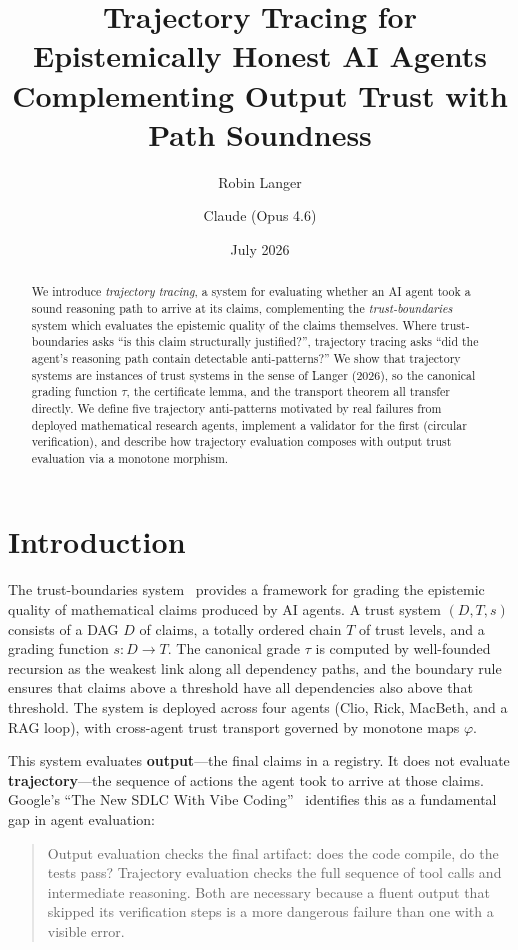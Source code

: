 \documentclass[11pt,a4paper]{article}
\title{Trajectory Tracing for Epistemically Honest AI Agents\\[6pt]
\large Complementing Output Trust with Path Soundness}
\author{Robin Langer \and Claude (Opus 4.6)}
\date{July 2026}
\theoremstyle{definition}
\theoremstyle{plain}
\theoremstyle{remark}
\begin{document}
\maketitle

\begin{abstract}
We introduce \emph{trajectory tracing}, a system for evaluating whether an AI agent took a sound reasoning path to arrive at its claims, complementing the \emph{trust-boundaries} system which evaluates the epistemic quality of the claims themselves. Where trust-boundaries asks ``is this claim structurally justified?'', trajectory tracing asks ``did the agent's reasoning path contain detectable anti-patterns?'' We show that trajectory systems are instances of trust systems in the sense of Langer (2026), so the canonical grading function $\tau$, the certificate lemma, and the transport theorem all transfer directly. We define five trajectory anti-patterns motivated by real failures from deployed mathematical research agents, implement a validator for the first (circular verification), and describe how trajectory evaluation composes with output trust evaluation via a monotone morphism.
\end{abstract}

\tableofcontents

\section{Introduction}

The trust-boundaries system~\cite{trust-boundaries} provides a framework for grading the epistemic quality of mathematical claims produced by AI agents. A trust system $(D, T, s)$ consists of a DAG $D$ of claims, a totally ordered chain $T$ of trust levels, and a grading function $s : D \to T$. The canonical grade $\tau$ is computed by well-founded recursion as the weakest link along all dependency paths, and the boundary rule ensures that claims above a threshold have all dependencies also above that threshold. The system is deployed across four agents (Clio, Rick, MacBeth, and a RAG loop), with cross-agent trust transport governed by monotone maps $\varphi$.

This system evaluates \textbf{output}---the final claims in a registry. It does not evaluate \textbf{trajectory}---the sequence of actions the agent took to arrive at those claims. Google's ``The New SDLC With Vibe Coding''~\cite{google-sdlc} identifies this as a fundamental gap in agent evaluation:

\begin{quote}
Output evaluation checks the final artifact: does the code compile, do the tests pass? Trajectory evaluation checks the full sequence of tool calls and intermediate reasoning. Both are necessary because a fluent output that skipped its verification steps is a more dangerous failure than one with a visible error.
\end{quote}
\end{document}
